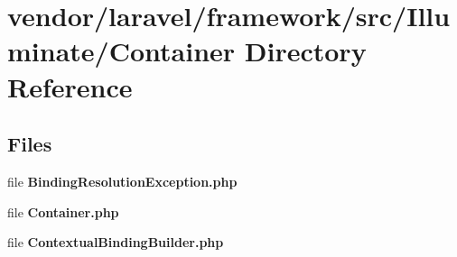 \section{vendor/laravel/framework/src/\+Illuminate/\+Container Directory Reference}
\label{dir_31167fddd2e76c8c43d052a56152efb7}
\subsection*{Files}
\begin{DoxyCompactItemize}
\item 
file {\bf Binding\+Resolution\+Exception.\+php}
\item 
file {\bf Container.\+php}
\item 
file {\bf Contextual\+Binding\+Builder.\+php}
\end{DoxyCompactItemize}
